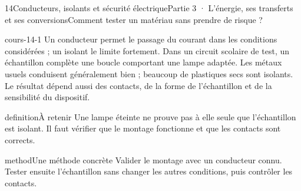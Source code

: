 \documentclass[12pt,twoside,openany]{book}
\begin{document}
\clearpage\pagestyle{otMain}
\begin{ouverture}[college3]{14}{Conducteurs, isolants et sécurité électrique}{Partie 3 · L’énergie, ses transferts et ses conversions}{Comment tester un matériau sans prendre de risque ?}
\end{ouverture}
\label{ch-14-cours-1}
\label{ess-14}
\begin{pcFiche}{cours-14-1}
Un conducteur permet le passage du courant dans les conditions considérées ; un isolant le limite fortement. Dans un circuit scolaire de test, un échantillon complète une boucle comportant une lampe adaptée. Les métaux usuels conduisent généralement bien ; beaucoup de plastiques secs sont isolants. Le résultat dépend aussi des contacts, de la forme de l’échantillon et de la sensibilité du dispositif.\par
{}
\begin{pcEncadre}{definition}{À retenir}
Une lampe éteinte ne prouve pas à elle seule que l’échantillon est isolant. Il faut vérifier que le montage fonctionne et que les contacts sont corrects.\par
\end{pcEncadre}
\begin{pcEncadre}{method}{Une méthode concrète}
Valider le montage avec un conducteur connu. Tester ensuite l’échantillon sans changer les autres conditions, puis contrôler les contacts.\par
\end{pcEncadre}
\end{pcFiche}
\label{ch-14-cours-2}
\end{document}
